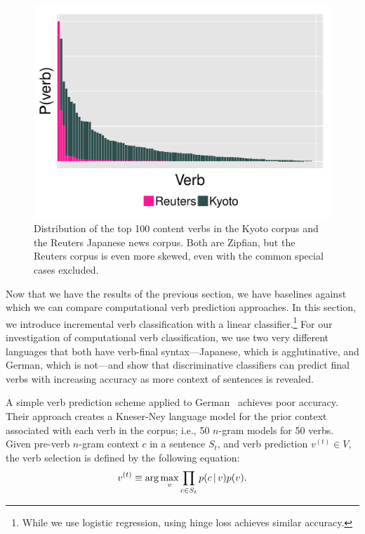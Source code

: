 \begin{figure}[t!]
 \begin{center}
   \includegraphics[width=1.0\linewidth]{2016_conll_verbpred/figures/top100verbs_kyoto_hist_no_suru-iru-aru-naru}
   \caption{Distribution of the top 100 content verbs in the Kyoto corpus and
     the Reuters Japanese news corpus.  Both are Zipfian, but the Reuters corpus
     is even more skewed, even with the common special cases
     excluded.}
 \label{fig:hist}
  \end{center}
\end{figure}

Now that we have the results of the previous section, we have
baselines against which we can compare computational verb prediction
approaches.  In this section, we introduce incremental verb
classification with a linear classifier.\footnote{While we use
  logistic regression, using hinge loss achieves similar accuracy.}
For our investigation of computational verb classification, we use two
very different languages that both have verb-final syntax---Japanese,
which is agglutinative, and German, which is not---and show that
discriminative classifiers can predict final verbs with increasing
accuracy as more context of sentences is revealed.

A simple verb prediction scheme applied to German~\cite{grissom2014}
achieves poor accuracy.  Their approach creates a Kneser-Ney \ngram{}
language model for the prior context associated with each verb in the
corpus; i.e., 50 $n$-gram models for 50 verbs. Given pre-verb $n$-gram
context $c$ in a sentence $S_t$, and verb prediction $v^{(t)}\in V$,
the verb selection is defined by the following equation:
\begin{equation}
  \label{eq:ngram}
  v^{(t)} \equiv \arg \max_v \prod_{c \in S_t} p(c \, | \, v) p(v).
\end{equation}

